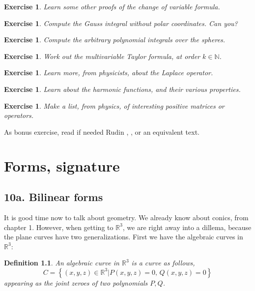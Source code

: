\documentclass[12pt]{amsbook}
\newtheorem{definition}[theorem]{Definition}
\newtheorem{exercise}[theorem]{Exercise}
\begin{document}
\begin{exercise}
Learn some other proofs of the change of variable formula.
\end{exercise}

\begin{exercise}
Compute the Gauss integral without polar coordinates. Can you?
\end{exercise}

\begin{exercise}
Compute the arbitrary polynomial integrals over the spheres.
\end{exercise}

\begin{exercise}
Work out the multivariable Taylor formula, at order $k\in\mathbb N$.
\end{exercise}

\begin{exercise}
Learn more, from physicists, about the Laplace operator.
\end{exercise}

\begin{exercise}
Learn about the harmonic functions, and their various properties.
\end{exercise}

\begin{exercise}
Make a list, from physics, of interesting positive matrices or operators.
\end{exercise}

As bonus exercise, read if needed Rudin \cite{ru1}, \cite{ru2}, or an equivalent text.

\chapter{Forms, signature}

\section*{10a. Bilinear forms}

It is good time now to talk about geometry. We already know about conics, from chapter 1. However, when getting to $\mathbb R^3$, we are right away into a dillema, because the plane curves have two generalizations. First we have the algebraic curves in $\mathbb R^3$:

\begin{definition}
An algebraic curve in $\mathbb R^3$ is a curve as follows,
$$C=\left\{(x,y,z)\in\mathbb R^3\Big|P(x,y,z)=0,\,Q(x,y,z)=0\right\}$$
appearing as the joint zeroes of two polynomials $P,Q$.
\end{definition}
\end{document}
